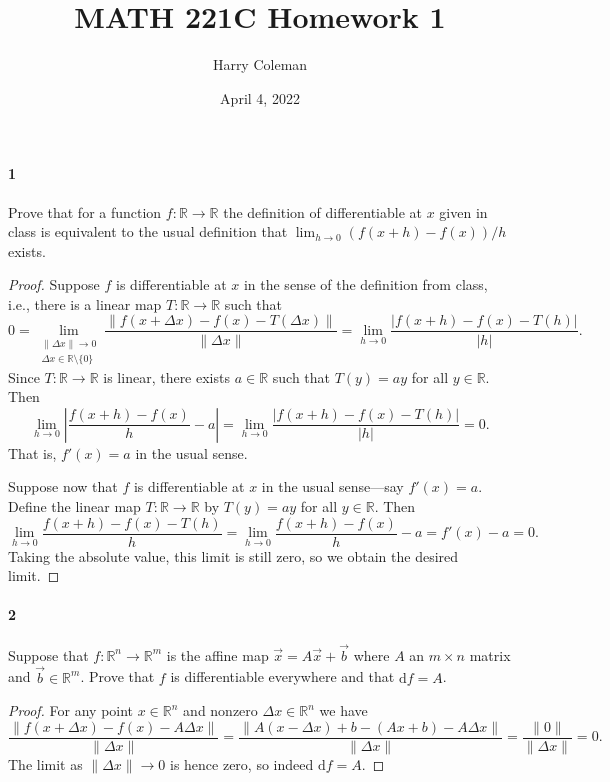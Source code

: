 \documentclass[12pt]{article}
\renewcommand{\maketitle}{\thispagestyle{title}}
\newlength{\myparskip}
\newenvironment{fullbox}{\begin{lrbox}{\savefullbox}\begin{minipage}{\dimexpr\textwidth-2\fboxsep\relax}\setlength{\parskip}{\myparskip}}{\end{minipage}\end{lrbox}\framebox[\textwidth]{\usebox{\savefullbox}}}
\newenvironment{pbox}[1][]{\begin{fullbox}\ifx#1\empty\else\paragraph{#1}\phantom{}\fi}{\end{fullbox}}
\theoremstyle{definition}
\newcommand{\R}{\mathbb{R}}
\newcommand{\<}{\langle}
\renewcommand{\>}{\rangle}
\newcommand{\dd}{\mathrm{d}}
\begin{document}
\title{MATH 221C Homework 1}
\author{Harry Coleman}
\date{April 4, 2022}
\maketitle

\begin{pbox}[1]
    Prove that for a function $f : \R \to \R$ the definition of differentiable at $x$ given in class is equivalent to the usual definition that $\lim_{h \to 0} (f(x + h) - f(x))/h$ exists.
\end{pbox}

\begin{proof}
    Suppose $f$ is differentiable at $x$ in the sense of the definition from class, i.e., there is a linear map $T : \R \to \R$ such that
    \[
        0
            = \lim_{\substack{\|\Delta x\| \to 0 \\ \Delta x \in \R \setminus \{0\}}} \frac{\|f(x + \Delta x) - f(x)  - T(\Delta x)\|}{\|\Delta x\|}
            = \lim_{h \to 0} \frac{|f(x + h) - f(x) - T(h)|}{|h|}.
    \]
    Since $T : \R \to \R$ is linear, there exists $a \in \R$ such that $T(y) = ay$ for all $y \in \R$.
    Then
    \[
        \lim_{h \to 0} \left|\frac{f(x + h) - f(x)}{h} - a \right|
            = \lim_{h \to 0} \frac{|f(x + h) - f(x) - T(h)|}{|h|}
            = 0.
    \]
    That is, $f'(x) = a$ in the usual sense.

    Suppose now that $f$ is differentiable at $x$ in the usual sense---say $f'(x) = a$.
    Define the linear map $T : \R \to \R$ by $T(y) = ay$ for all $y \in \R$.
    Then
    \[
        \lim_{h \to 0} \frac{f(x + h) - f(x) - T(h)}{h}
            = \lim_{h \to 0} \frac{f(x + h) - f(x)}{h} - a
            = f'(x) - a
            = 0.
    \]
    Taking the absolute value, this limit is still zero, so we obtain the desired limit.
\end{proof}


\begin{pbox}[2]
    Suppose that $f : \R^n \to \R^m$ is the affine map $\vec{x} = A\vec{x} + \vec{b}$ where $A$ an $m \times n$ matrix and $\vec{b} \in \R^m$.
    Prove that $f$ is differentiable everywhere and that $\dd{f} = A$.
\end{pbox}

\begin{proof}
    For any point $x \in \R^n$ and nonzero $\Delta x \in \R^n$ we have
    \[
        \frac{\|f(x + \Delta x) - f(x)  - A\Delta x\|}{\|\Delta x\|}
            = \frac{\|A(x - \Delta x) + b - (Ax + b)  - A\Delta x\|}{\|\Delta x\|}
            = \frac{\|0\|}{\|\Delta x\|}
            = 0.
    \]
    The limit as $\|\Delta x\| \to 0$ is hence zero, so indeed $\dd{f} = A$.
\end{proof}
\end{document}

